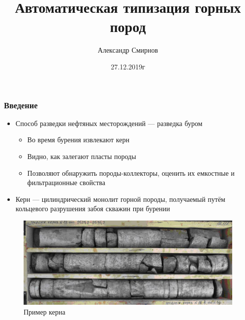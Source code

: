 \documentclass[xetex,mathserif,serif]{beamer}
\title{Автоматическая типизация горных пород}
\author{Александр Смирнов}
\date{27.12.2019г}
\begin{document}
	\frame{\titlepage}


	\begin{frame}
		\frametitle{Введение}
		
		\begin{itemize}
	    	\item Способ разведки нефтяных месторождений — разведка буром
        	    \begin{itemize}
        	    	\item Во время бурения извлекают керн
        	    	\item Видно, как залегают пласты породы
        	    	\item Позволяют обнаружить породы-коллекторы, оценить их емкостные и фильтрационные свойства
            	\end{itemize}
            \item Керн — цилиндрический монолит горной породы, получаемый путём кольцевого разрушения забоя скважин при бурении
        \end{itemize}	
        
        \begin{figure}[h]
            \label{керн}
            \centering
            \includegraphics[scale=0.25]{images/kern.jpg}
            \caption{Пример керна}
        \end{figure}
        
	\end{frame}
\end{document}
